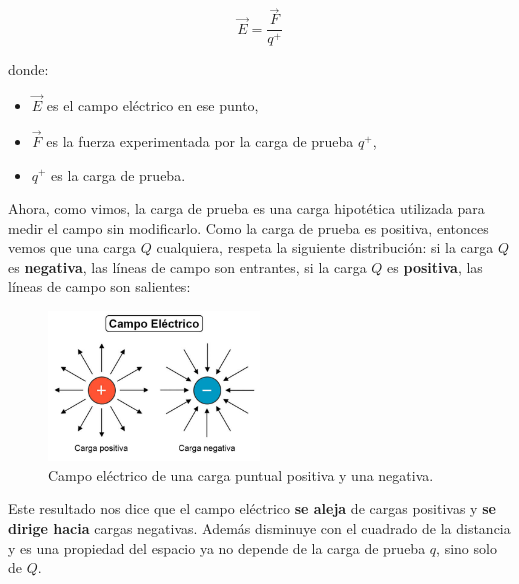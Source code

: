 \begin{equation}
    \vec{E} = \frac{\vec{F}}{q^{+}}
    \label{eq:campo_electrico}
\end{equation}

donde:
\begin{itemize}
    \item \( \vec{E} \) es el campo eléctrico en ese punto,
    \item \( \vec{F} \) es la fuerza experimentada por la carga de prueba \( q^{+} \),
    \item \( q^{+} \) es la carga de prueba.
\end{itemize}

Ahora, como vimos, la carga de prueba es una carga hipotética utilizada para medir el campo sin modificarlo. Como la carga de prueba es positiva, entonces vemos que una carga \(Q\) cualquiera, respeta la siguiente distribución: si la carga \(Q\) es \textbf{negativa}, las líneas de campo son entrantes, si la carga \(Q\) es \textbf{positiva}, las líneas de campo son salientes:

\begin{figure}[ht]
    \centering
    \includegraphics[width=0.5\textwidth]{images/electric_field.jpg}
    \caption{Campo eléctrico de una carga puntual positiva y una negativa.}
    \label{fig:campo_electrico}
\end{figure}

Este resultado nos dice que el campo eléctrico \textbf{se aleja} de cargas positivas y \textbf{se dirige hacia} cargas negativas. Además disminuye con el cuadrado de la distancia y es una propiedad del espacio ya no depende de la carga de prueba \( q \), sino solo de \( Q \).

